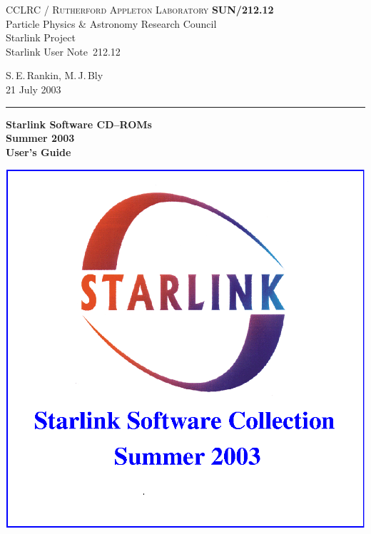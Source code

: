 \documentclass[twoside,11pt]{article}
\newcommand{\stardoccategory}  {Starlink User Note}
\newcommand{\stardocinitials}  {SUN}
\newcommand{\stardocnumber}    {212.12}
\newcommand{\stardocauthors}   {S.\,E.\,Rankin, M.\,J.\,Bly}
\newcommand{\stardocdate}      {21 July 2003}
\newcommand{\stardoctitle}     {Starlink Software CD--ROMs}
\newcommand{\stardocversion}   {Summer 2003}
\newcommand{\stardocmanual}    {User's Guide}
\newcommand{\stardocname}{\stardocinitials /\stardocnumber}
\newenvironment{latexonly}{}{}
\renewcommand{\_}{\texttt{\symbol{95}}}
\begin{document}
\thispagestyle{empty}

\begin{latexonly}
   CCLRC / \textsc{Rutherford Appleton Laboratory} \hfill \textbf{\stardocname}\\
   {\large Particle Physics \& Astronomy Research Council}\\
   {\large Starlink Project\\}
   {\large \stardoccategory\ \stardocnumber}
   \begin{flushright}
   \stardocauthors\\
   \stardocdate
   \end{flushright}
   \vspace{-4mm}
   \rule{\textwidth}{0.5mm}
   \vspace{5mm}
   \begin{center}
   {\Huge\textbf{\stardoctitle \\ [2.5ex]}}
   {\LARGE\textbf{\stardocversion \\ [4ex]}}
   {\Huge\textbf{\stardocmanual}}
   \end{center}
   \vspace{5mm}

\centering \includegraphics[scale=1.0]{sun212_cover.eps}


\end{latexonly}
\end{document}

